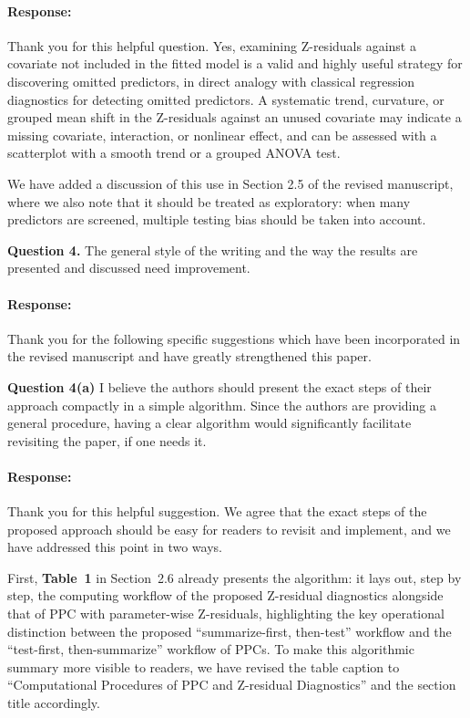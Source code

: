 \documentclass[11pt]{article}
\newcommand*{\mybox}[2]{%
  \par\medskip\noindent
  \colorbox{#1!30}{\parbox{.98\linewidth}{#2}}%
  \par\medskip
}
\begin{document}
\paragraph{Response:}

Thank you for this helpful question. Yes, examining Z-residuals against a covariate not included in the fitted model is a valid and highly useful strategy for discovering omitted predictors, in direct analogy with classical regression diagnostics for detecting omitted predictors. A systematic trend, curvature, or grouped mean shift in the Z-residuals against an unused covariate may indicate a missing covariate, interaction, or nonlinear effect, and can be assessed with a scatterplot with a smooth trend or a grouped ANOVA test.

We have added a discussion of this use in Section 2.5 of the revised manuscript, where we also note that it should be treated as exploratory: when many predictors are screened, multiple testing bias should be taken into account.

\medskip

\mybox{gray}{\textbf{Question 4.} The general style of the writing and the way the results are presented and discussed need improvement.}

\paragraph{Response:} Thank you for the following specific suggestions which have been incorporated in the revised manuscript and have greatly strengthened this paper.

\mybox{gray}{\textbf{Question 4(a)} I believe the authors should present the exact steps of their approach compactly in a simple algorithm. Since the authors are providing a general procedure, having a clear algorithm would significantly facilitate revisiting the paper, if one needs it.}


\paragraph{Response:}
Thank you for this helpful suggestion. We agree that the exact steps of the proposed approach should be easy for readers to revisit and implement, and we have addressed this point in two ways.

First, \textbf{Table~1} in Section~2.6 already presents the algorithm: it lays out, step by step, the computing workflow of the proposed Z-residual diagnostics alongside that of PPC with parameter-wise Z-residuals, highlighting the key operational distinction between the proposed ``summarize-first, then-test'' workflow and the ``test-first, then-summarize'' workflow of PPCs. To make this algorithmic summary more visible to readers, we have revised the table caption to ``Computational Procedures of PPC and Z-residual Diagnostics'' and the section title accordingly.
\end{document}
